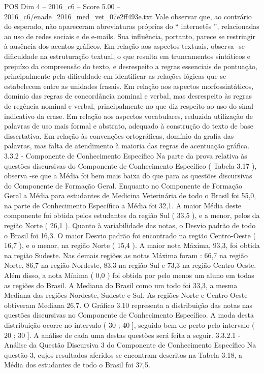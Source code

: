 \begin{textsample}{POS Dim 4 – 2016\_c6 – Score 5.00 – 2016\_c6/enade\_2016\_med\_vet\_07e2ff493e.txt}
Vale observar que, ao contrário do esperado, não apareceram abreviaturas próprias do “ internetês ”, relacionadas ao uso de redes sociais e de e-mails.
Sua influência, portanto, parece se restringir à ausência dos acentos gráficos.
Em relação aos aspectos textuais, observa -se dificuldade na estruturação textual, o que resulta em truncamentos sintáticos e prejuízo da compreensão do texto, e desrespeito a regras essenciais de pontuação, principalmente pela dificuldade em identificar as relações lógicas que se estabelecem entre as unidades frasais.
Em relação aos aspectos morfossintáticos, domínio das regras de concordância nominal e verbal, mas desrespeito às regras de regência nominal e verbal, principalmente no que diz respeito ao uso do sinal indicativo da crase.
Em relação aos aspectos vocabulares, reduzida utilização de palavras de uso mais formal e abstrato, adequado à construção do texto de base dissertativa.
Em relação às convenções ortográficas, domínio da grafia das palavras, mas falta de atendimento à maioria das regras de acentuação gráfica. 3.3.2 - Componente de Conhecimento Específico Na parte da prova relativa às questões discursivas do Componente de Conhecimento Específico ( Tabela 3.17 ), observa -se que a Média foi bem mais baixa do que para as questões discursivas do Componente de Formação Geral.
Enquanto no Componente de Formação Geral a Média para estudantes de Medicina Veterinária de todo o Brasil foi 55,0, na parte de Conhecimento Específico a Média foi 32,1.
A maior Média deste componente foi obtida pelos estudantes da região Sul ( 33,5 ), e a menor, pelos da região Norte ( 26,1 ).
Quanto à variabilidade das notas, o Desvio padrão de todo o Brasil foi 16,3.
O maior Desvio padrão foi encontrado na região Centro-Oeste ( 16,7 ), e o menor, na região Norte ( 15,4 ).
A maior nota Máxima, 93,3, foi obtida na região Sudeste.
Nas demais regiões as notas Máxima foram : 66,7 na região Norte, 86,7 na região Nordeste, 83,3 na região Sul e 73,3 na região Centro-Oeste.
Além disso, a nota Mínima ( 0,0 ) foi obtida por pelo menos um aluno em todas as regiões do Brasil.
A Mediana do Brasil como um todo foi 33,3, a mesma Mediana das regiões Nordeste, Sudeste e Sul.
As regiões Norte e Centro-Oeste obtiveram Mediana 26,7.
O Gráfico 3.10 representa a distribuição das notas nas questões discursivas no Componente de Conhecimento Específico.
A moda desta distribuição ocorre no intervalo ( 30 ; 40 ], seguido bem de perto pelo intervalo ( 20 ; 30 ].
A análise de cada uma destas questões será feita a seguir. 3.3.2.1 - Análise da Questão Discursiva 3 do Componente de Conhecimento Específico Na questão 3, cujos resultados aferidos se encontram descritos na Tabela 3.18, a Média dos estudantes de todo o Brasil foi 37,5.

\end{textsample}

